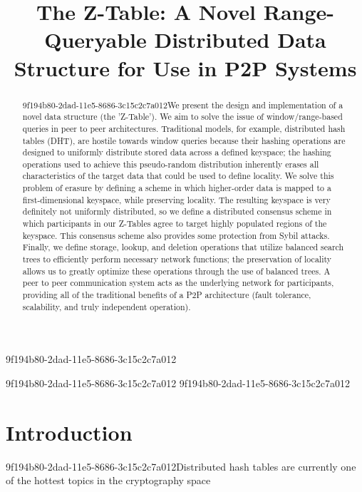 \documentclass[12pt]{article}
\title{The Z-Table: A Novel Range-Queryable Distributed Data Structure for Use in P2P Systems}
\begin{document}
9f194b80-2dad-11e5-8686-3c15c2c7a012
\maketitle

\begin{abstract}
9f194b80-2dad-11e5-8686-3c15c2c7a012We present the design and implementation of a novel data structure (the 'Z-Table'). We aim to solve the issue of window/range-based queries in peer to peer architectures. Traditional models, for example,  distributed hash tables (DHT), are hostile towards window queries because their hashing operations are designed to uniformly distribute stored data across a defined keyspace; the hashing operations used to achieve this pseudo-random distribution inherently erases all characteristics of the target data that could be used to define locality. We solve this problem of erasure by defining a scheme in which higher-order data is mapped to a first-dimensional keyspace, while preserving locality. The resulting keyspace is very definitely not uniformly distributed, so we define a distributed consensus scheme in which participants in our Z-Tables agree to target highly populated regions of the keyspace. This consensus scheme also provides some protection from Sybil attacks. Finally, we define storage, lookup, and deletion operations that utilize balanced search trees to efficiently perform necessary network functions; the preservation of locality allows us to greatly optimize these operations through the use of balanced trees. A peer to peer communication system acts as the underlying network for participants, providing all of the traditional benefits of a P2P architecture (fault tolerance, scalability, and truly independent operation).
\end{abstract}
9f194b80-2dad-11e5-8686-3c15c2c7a012
9f194b80-2dad-11e5-8686-3c15c2c7a012
\newpage
\section{Introduction}
9f194b80-2dad-11e5-8686-3c15c2c7a012Distributed hash tables are currently one of the hottest topics in the cryptography space~\cite{Stoica:2001dj,Rowstron:2001ea,Ratnasamy:2001wn}

\printbibliography
\end{document}
